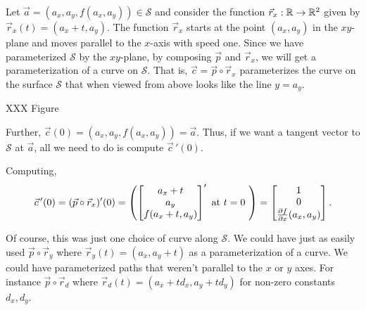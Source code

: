 Let $\vec a=(a_x,a_y,f(a_x,a_y))\in\mathcal S$ and consider the function $\vec r_x:\mathbb{R}\to\mathbb{R}^2$
given by $\vec r_x(t) = (a_x+t,a_y)$.  The function $\vec r_x$ starts at the point $(a_x,a_y)$
in the $xy$-plane and moves parallel to the $x$-axis with speed one.  Since we have parameterized
$\mathcal S$ by the $xy$-plane, by composing $\vec p$ and $\vec r_x$, we will get a parameterization
of a curve on $\mathcal S$.  That is, $\vec c=\vec p\circ \vec r_x$ parameterizes the curve
on the surface $\mathcal S$ that when viewed from above looks like the line $y=a_y$.

XXX Figure

Further, $\vec c(0)=(a_x,a_y,f(a_x,a_y))=\vec a$.  Thus, if we want a tangent
vector to $\mathcal S$ at $\vec a$, all we need to do is compute $\vec c\,'(0)$.

Computing,
\[
	\vec c\,'(0)=(\vec p\circ \vec r_x)'(0)=
	\left(\begin{bmatrix}a_x+t\\a_y\\f(a_x+t,a_y)\end{bmatrix}'\text{ at $t=0$ } \right)
	= \begin{bmatrix}1\\0\\\frac{\partial f}{\partial x}(a_x,a_y)\end{bmatrix}.
\]

Of course, this was just one choice of curve along $\mathcal S$.  We could
have just as easily used $\vec p\circ \vec r_y$ where $\vec r_y(t)=(a_x,a_y+t)$
as a parameterization of a curve.  We could have parameterized paths
that weren't parallel to the $x$ or $y$ axes.  For instance
$\vec p\circ \vec r_{d}$ where $\vec r_{d}(t) = (a_x+td_x, a_y+td_y)$
for non-zero constants $d_x,d_y$.

